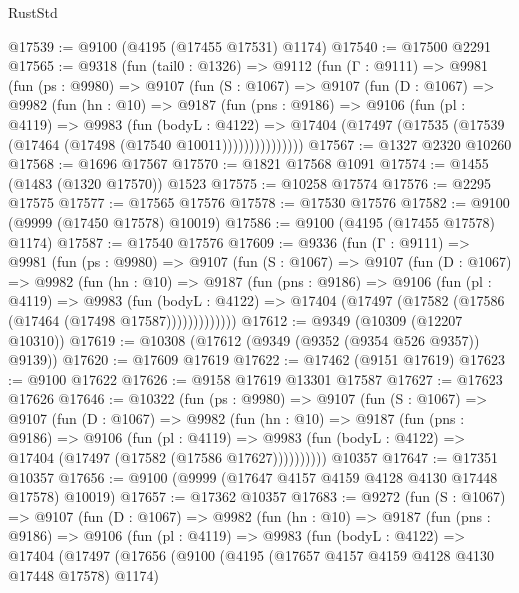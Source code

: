 \begin{lexlean}{RustStd}
\begin{coremodule}
@17539 := @9100 (@4195 (@17455 @17531) @1174)
@17540 := @17500 @2291
@17565 := @9318
    (fun (tail0 : @1326) =>
    @9112
      (fun (Γ : @9111) =>
      @9981
        (fun (ps : @9980) =>
        @9107
          (fun (S : @1067) =>
          @9107
            (fun (D : @1067) =>
            @9982
              (fun (hn : @10) =>
              @9187
                (fun (pns : @9186) =>
                @9106
                  (fun (pl : @4119) =>
                  @9983
                    (fun (bodyL : @4122) =>
                    @17404 (@17497 (@17535 (@17539 (@17464 (@17498 (@17540 @10011)))))))))))))))
@17567 := @1327 @2320 @10260
@17568 := @1696 @17567
@17570 := @1821 @17568 @1091
@17574 := @1455 (@1483 (@1320 @17570)) @1523
@17575 := @10258 @17574
@17576 := @2295 @17575
@17577 := @17565 @17576
@17578 := @17530 @17576
@17582 := @9100 (@9999 (@17450 @17578) @10019)
@17586 := @9100 (@4195 (@17455 @17578) @1174)
@17587 := @17540 @17576
@17609 := @9336
    (fun (Γ : @9111) =>
    @9981
      (fun (ps : @9980) =>
      @9107
        (fun (S : @1067) =>
        @9107
          (fun (D : @1067) =>
          @9982
            (fun (hn : @10) =>
            @9187
              (fun (pns : @9186) =>
              @9106
                (fun (pl : @4119) =>
                @9983
                  (fun (bodyL : @4122) =>
                  @17404 (@17497 (@17582 (@17586 (@17464 (@17498 @17587)))))))))))))
@17612 := @9349 (@10309 (@12207 @10310))
@17619 := @10308 (@17612 (@9349 (@9352 (@9354 @526 @9357)) @9139))
@17620 := @17609 @17619
@17622 := @17462 (@9151 @17619)
@17623 := @9100 @17622
@17626 := @9158 @17619 @13301 @17587
@17627 := @17623 @17626
@17646 := @10322
    (fun (ps : @9980) =>
    @9107
      (fun (S : @1067) =>
      @9107
        (fun (D : @1067) =>
        @9982
          (fun (hn : @10) =>
          @9187
            (fun (pns : @9186) =>
            @9106
              (fun (pl : @4119) =>
              @9983 (fun (bodyL : @4122) => @17404 (@17497 (@17582 (@17586 @17627))))))))))
    @10357
@17647 := @17351 @10357
@17656 := @9100 (@9999 (@17647 @4157 @4159 @4128 @4130 @17448 @17578) @10019)
@17657 := @17362 @10357
@17683 := @9272
    (fun (S : @1067) =>
    @9107
      (fun (D : @1067) =>
      @9982
        (fun (hn : @10) =>
        @9187
          (fun (pns : @9186) =>
          @9106
            (fun (pl : @4119) =>
            @9983
              (fun (bodyL : @4122) =>
              @17404
                (@17497
                  (@17656
                    (@9100
                      (@4195 (@17657 @4157 @4159 @4128 @4130 @17448 @17578) @1174)

\end{coremodule}
\end{lexlean}
